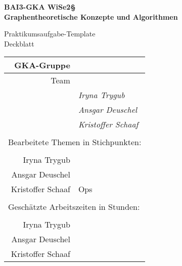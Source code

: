 

\thispagestyle{empty}
\begin{center}

    {\large {\bf   BAI3-GKA WiSe2§ \\ Graphentheoretische Konzepte und Algorithmen \\[5mm]} }
    
{\huge Praktikumsaufgabe-Template  \\[5mm] Deckblatt}\\

\end{center}

				\begin{tabular}[t]{|r|l|}
				 \hline
				GKA-Gruppe&                 \raisebox{-3mm}{\rule[8mm]{100mm}{0mm} }\\ \hline    
				Team &                                                        \\ \hline			
				& \textit{Iryna Trygub }               \\ \hline    
				& \textit{Ansgar Deuschel }               \\ \hline			
				& \textit{Kristoffer Schaaf }             \\ \hline  			
				\multicolumn{2}{c}{}\\  			
				\multicolumn{2}{l}{Bearbeitete Themen in Stichpunkten:}\\			
				\multicolumn{2}{c}{}\\  \hline
				Iryna Trygub &              \\ \hline    
				Ansgar Deuschel &                \\ \hline			
				Kristoffer Schaaf & Ops            \\ \hline 		
				\multicolumn{2}{c}{}\\  			
				\multicolumn{2}{l}{Geschätzte Arbeitszeiten in Stunden:}\\			
				\multicolumn{2}{c}{}\\  \hline
				Iryna Trygub &               \\ \hline    
				Ansgar Deuschel &                \\ \hline			
				Kristoffer Schaaf &               \\ \hline 			
				\end{tabular}
~\\[4mm]
		
		
\vfill


